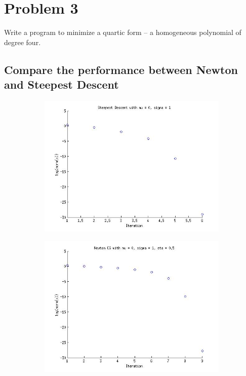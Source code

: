 \documentclass{article}
\begin{document}
\section{Problem 3}

Write a program to minimize a quartic form -- a homogeneous polynomial
of degree four. 
\newpage
\subsection{Compare the performance between Newton and Steepest Descent}

\begin{figure}[!htb]
        \centering
        \begin{subfigure}[bh]{0.45\textwidth}
                \includegraphics[width=\textwidth]{figs/P3SDmu0sig1.jpg}
        \end{subfigure}%
        \begin{subfigure}[bh]{0.45\textwidth}
                \includegraphics[width=\textwidth]{figs/P3NCGmu0sig1eta1.jpg}

\end{subfigure}
\end{figure}
\end{document}
